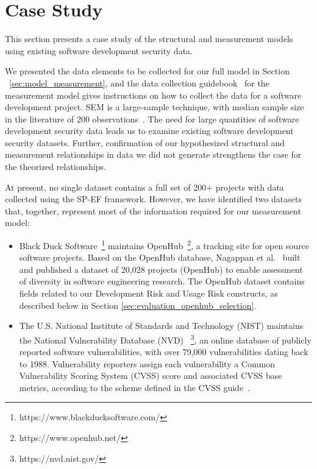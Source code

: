 \section{Case Study}
\label{sec:evaluation_openhub}
This section presents a case study of the structural and measurement models using existing software development security data.

We presented the data elements to be collected for our full model in Section ~\ref{sec:model_measurement}, and the data collection guidebook~\cite{morrison2016spefguide} for the measurement model gives instructions on how to collect the data for a software development project. SEM is a large-sample technique, with median sample size in the literature of 200 observations~\cite{kline2015principles}. The need for large quantities of software development security data leads us to examine existing software development security datasets. Further, confirmation of our hypothesized structural and measurement relationships in data we did not generate strengthens the case for the theorized relationships.

At present, no single dataset contains a full set of 200+ projects with data collected using the SP-EF framework. However,  we have identified two datasets that, together, represent most of the  information required for our measurement model:
\begin{itemize}
\item Black Duck Software~\footnote{https://www.blackducksoftware.com/} maintains OpenHub~\footnote{https://www.openhub.net/}, a tracking site for open source software projects. Based on the OpenHub database, Nagappan et al.~\cite{nagappan2013diversity} built and published a dataset of 20,028 projects (OpenHub) to enable assessment of diversity in software engineering research. The OpenHub dataset contains fields related to our Development Risk and Usage Risk constructs, as described below in Section \ref{sec:evaluation_openhub_selection}.
\item The U.S. National Institute of Standards and Technology (NIST) maintains the National Vulnerability Database (NVD) ~\footnote{https://nvd.nist.gov/}, an online database of publicly reported software vulnerabilities, with over 79,000 vulnerabilities dating back to 1988. Vulnerability reporters assign each vulnerability a Common Vulnerability Scoring System (CVSS) score and associated CVSS base metrics, according to the scheme defined in the CVSS guide~\cite{mell2007complete}. 
\end{itemize}

